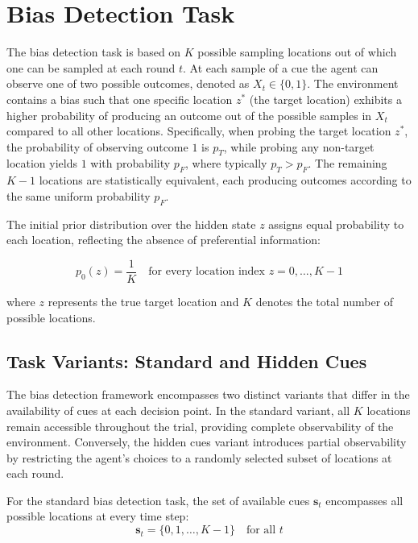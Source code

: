 \documentclass{article}
\begin{document}
\section{Bias Detection Task}

The bias detection task is based on $K$ possible sampling locations out of which one can be sampled at each round $t$. At each sample of a cue the agent can observe one of two possible outcomes, denoted as $X_t \in \{0, 1\}$. The environment contains a bias such that one specific location $z^*$ (the target location) exhibits a higher probability of producing an outcome out of the possible samples in $X_t$ compared to all other locations. Specifically, when probing the target location $z^*$, the probability of observing outcome $1$ is $p_T$, while probing any non-target location yields $1$ with probability $p_F$, where typically $p_T > p_F$. The remaining $K-1$ locations are statistically equivalent, each producing outcomes according to the same uniform probability $p_F$. 

The initial prior distribution over the hidden state $z$ assigns equal probability to each location, reflecting the absence of preferential information:

\begin{equation}
p_0(z) = \frac{1}{K} \quad \text{for every location index } z = 0, \ldots, K-1
\end{equation}

where $z$ represents the true target location and $K$ denotes the total number of possible locations.

\subsection{Task Variants: Standard and Hidden Cues}

The bias detection framework encompasses two distinct variants that differ in the availability of cues at each decision point. In the standard variant, all $K$ locations remain accessible throughout the trial, providing complete observability of the environment. Conversely, the hidden cues variant introduces partial observability by restricting the agent's choices to a randomly selected subset of locations at each round.

For the standard bias detection task, the set of available cues $\mathbf{s}_t$ encompasses all possible locations at every time step:
\begin{equation}
\mathbf{s}_t = \{0, 1, \ldots, K-1\} \quad \text{for all } t
\end{equation}
\end{document}
